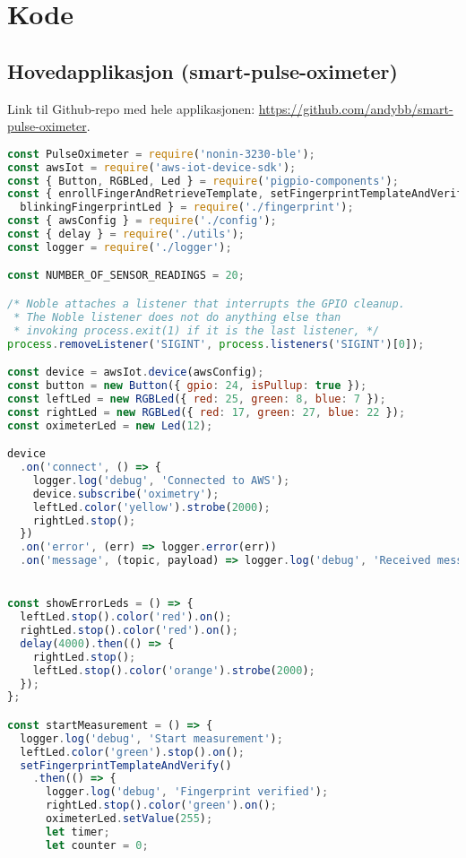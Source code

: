 
\chapter{Kode}

\section{Hovedapplikasjon (smart-pulse-oximeter)}
\label{appendix:smart-pulse-oximeter}
Link til Github-repo med hele applikasjonen:
    \url{https://github.com/andybb/smart-pulse-oximeter}.

\begin{lstlisting}[frame=single, language=JavaScript,
    caption=smart-pulse-oximeter: index.js, label=lst:smart-pulse-oximeter]
const PulseOximeter = require('nonin-3230-ble');
const awsIot = require('aws-iot-device-sdk');
const { Button, RGBLed, Led } = require('pigpio-components');
const { enrollFingerAndRetrieveTemplate, setFingerprintTemplateAndVerify,
  blinkingFingerprintLed } = require('./fingerprint');
const { awsConfig } = require('./config');
const { delay } = require('./utils');
const logger = require('./logger');

const NUMBER_OF_SENSOR_READINGS = 20;

/* Noble attaches a listener that interrupts the GPIO cleanup.
 * The Noble listener does not do anything else than
 * invoking process.exit(1) if it is the last listener, */
process.removeListener('SIGINT', process.listeners('SIGINT')[0]);

const device = awsIot.device(awsConfig);
const button = new Button({ gpio: 24, isPullup: true });
const leftLed = new RGBLed({ red: 25, green: 8, blue: 7 });
const rightLed = new RGBLed({ red: 17, green: 27, blue: 22 });
const oximeterLed = new Led(12);

device
  .on('connect', () => {
    logger.log('debug', 'Connected to AWS');
    device.subscribe('oximetry');
    leftLed.color('yellow').strobe(2000);
    rightLed.stop();
  })
  .on('error', (err) => logger.error(err))
  .on('message', (topic, payload) => logger.log('debug', 'Received message', topic, payload));


const showErrorLeds = () => {
  leftLed.stop().color('red').on();
  rightLed.stop().color('red').on();
  delay(4000).then(() => {
    rightLed.stop();
    leftLed.stop().color('orange').strobe(2000);
  });
};

const startMeasurement = () => {
  logger.log('debug', 'Start measurement');
  leftLed.color('green').stop().on();
  setFingerprintTemplateAndVerify()
    .then(() => {
      logger.log('debug', 'Fingerprint verified');
      rightLed.stop().color('green').on();
      oximeterLed.setValue(255);
      let timer;
      let counter = 0;


\end{lstlisting}
